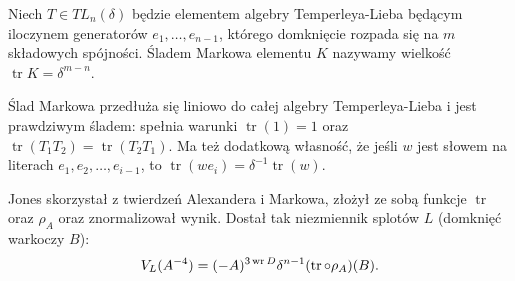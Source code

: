\begin{definition}
%
    Niech $T \in TL_n(\delta)$ będzie elementem algebry Temperleya-Lieba będącym iloczynem generatorów $e_1, \ldots, e_{n-1}$, którego domknięcie rozpada się na $m$ składowych spójności.
    Śladem Markowa elementu $K$ nazywamy wielkość $\operatorname{tr} K = \delta^{m-n}$.
\end{definition}

Ślad Markowa przedłuża się liniowo do całej algebry Temperleya-Lieba i jest prawdziwym śladem: spełnia warunki $\operatorname{tr} (1) = 1$ oraz $\operatorname{tr} (T_1T_2) = \operatorname{tr} (T_2T_1)$.
Ma też dodatkową własność, że jeśli $w$ jest słowem na literach $e_1, e_2, \ldots, e_{i-1}$, to $\operatorname{tr}(we_i) = \delta^{-1} \operatorname{tr} (w)$.

Jones skorzystał z twierdzeń Alexandera i Markowa, złożył ze sobą funkcje $\operatorname{tr}$ oraz $\rho_A$ oraz znormalizował wynik.
Dostał tak niezmiennik splotów $L$ (domknięć warkoczy $B$):
\begin{equation}
    V_L(A^{-4}) = (-A)^{3 \operatorname{wr} D} \delta^{n-1} (\operatorname{tr} \circ \rho_A)(B).
\end{equation}

